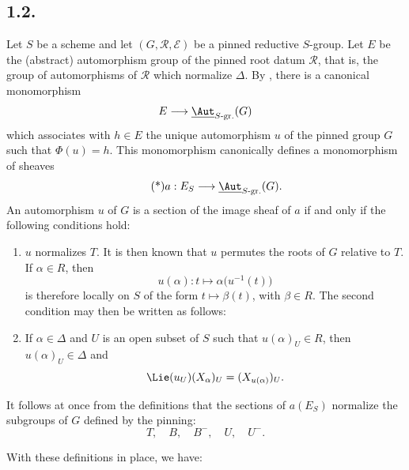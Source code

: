 \subsection*{1.2.}
Let \(S\) be a scheme and let \((G,\mathscr R,\mathcal E)\) be a
pinned reductive \(S\)-group. Let \(E\) be the \textup{(abstract)}
automorphism group of the pinned root datum \(\mathscr R\), that is,
the group of automorphisms of \(\mathscr R\) which normalize
\(\Delta\). By , there is a canonical monomorphism
\[
  E\longrightarrow \underline{\Aut}_{S\text{-}\mathrm{gr.}}(G)
\]
which associates with \(h\in E\) the unique automorphism \(u\) of the
pinned group \(G\) such that \(\Phi(u)=h\). This monomorphism
canonically defines a monomorphism of sheaves
\[
  \tag{*}\label{sga3:xxiv:subsection:1-2:equation:star}
  a:E_S\longrightarrow \underline{\Aut}_{S\text{-}\mathrm{gr.}}(G).
\]
An automorphism \(u\) of \(G\) is a section of the image sheaf of \(a\)
if and only if the following conditions hold:
\begin{enumerate}
\item[(i)] \(u\) normalizes \(T\). It is then known that \(u\)
  permutes the roots of \(G\) relative to \(T\). If \(\alpha\in R\),
  then
  \[
    u(\alpha):t\longmapsto\alpha\bigl(u^{-1}(t)\bigr)
  \]
  is therefore locally on \(S\) of the form
  \(t\longmapsto\beta(t)\), with \(\beta\in R\). The second condition
  may then be written as follows:
\item[(ii)] If \(\alpha\in\Delta\) and \(U\) is an open subset of
  \(S\) such that \(u(\alpha)_U\in R\), then
  \(u(\alpha)_U\in\Delta\) and
  \[
    \Lie(u_U)(X_\alpha)_U=(X_{u(\alpha)})_U.
  \]
\end{enumerate}
It follows at once from the definitions that the sections of
\(a(E_S)\) normalize the subgroups of \(G\) defined by the pinning:
\[
  T,\quad B,\quad B^{-},\quad U,\quad U^{-}.
\]

With these definitions in place, we have:



